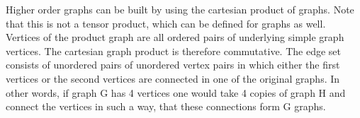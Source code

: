 \begin{center}
\end{center}

\noindent Higher order graphs can be built by using the cartesian product of graphs\cite{Sabidussi1959}. Note that this is not a tensor product, which can be defined for graphs as well. Vertices of the product graph are all ordered pairs of underlying simple graph vertices. The cartesian graph product is therefore commutative. The edge set consists of unordered pairs of unordered vertex pairs in which either the first vertices or the second vertices are connected in one of the original graphs. In other words, if graph G has 4 vertices one would take 4 copies of graph H and connect the vertices in such a way, that these connections form G graphs. 


